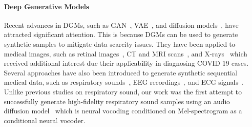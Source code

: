\documentclass{article}
\begin{document}
\paragraph{Deep Generative Models} Recent advances in DGMs, such as GAN~\cite{goodfellow2014generative}, VAE~\cite{kingma2013auto}, and diffusion models~\cite{ho2020denoising}, have attracted significant attention. This is because DGMs can be used to generate synthetic samples to mitigate data scarcity issues. They have been applied to medical images, such as retinal images~\cite{costa2017end,iqbal2018generative}, CT and MRI scans~\cite{nie2017medical, shin2018medical, bowles2018gan, sandfort2019data, han2019synthesizing, armanious2020medgan, wolleb2022diffusion, dorjsembe2022threedimensional}, and X-rays~\cite{loey2020within, motamed2021data} which received additional interest due their applicability in diagnosing COVID-19 cases. Several approaches have also been introduced to generate synthetic sequential medical data, such as respiratory sounds~\cite{kochetov2020generative, jayalakshmy2021conditional, saldanha2022data}, EEG recordings~\cite{fahimi2019towards, hazra2020synsiggan, tian2023dual}, and ECG signals~\cite{narvaez2020synthesis, wulan2020generating}.
Unlike previous studies on respiratory sound, our work was the first attempt to successfully generate high-fidelity respiratory sound samples using an audio diffusion model~\cite{kong2020diffwave} which is neural vocoding conditioned on Mel-spectrogram as a conditional neural vocoder.
\end{document}
